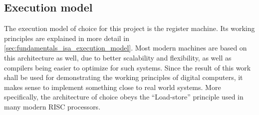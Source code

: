 \subsection{Execution model}

The execution model of choice for this project is the register machine. Its working principles are explained in more detail in \autoref{sec:fundamentals_isa_execution_model}. Most modern machines are based on this architecture as well, due to better scalability and flexibility, as well as compilers being easier to optimize for such systems. Since the result of this work shall be used for demonstrating the working principles of digital computers, it makes sense to implement something close to real world systems. More specifically, the architecture of choice obeys the ``Load-store'' principle used in many modern RISC processors.
